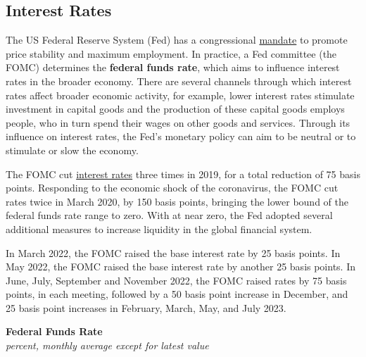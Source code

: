 \documentclass{report}
\begin{document}
{\begin{minipage}{1.0\textwidth}
\subsection*{Interest Rates}
\hypertarget{capint}{\label{capint}}
\small The US Federal Reserve System (Fed) has a congressional \href{https://www.federalreserve.gov/faqs/money_12848.htm}{mandate} to promote price stability and maximum employment. In practice, a Fed committee (the FOMC) determines the \textbf{federal funds rate}, which aims to influence interest rates in the broader economy. There are several channels through which interest rates affect broader economic activity, for example, lower interest rates stimulate investment in capital goods and the production of these capital goods employs people, who in turn spend their wages on other goods and services. Through its influence on interest rates, the Fed's monetary policy can aim to be neutral or to stimulate or slow the economy.

The FOMC cut \href{https://www.federalreserve.gov/releases/h15/}{interest rates} three times in 2019, for a total reduction of 75 basis points. Responding to the economic shock of the coronavirus, the FOMC cut rates twice in March 2020, by 150 basis points, bringing the lower bound of the federal funds rate range to zero. With at near zero, the Fed adopted several additional measures to increase liquidity in the global financial system.

In March 2022, the FOMC raised the base interest rate by 25 basis points. In May 2022, the FOMC raised the base interest rate by another 25 basis points. In June, July, September and November 2022, the FOMC raised rates by 75 basis points, in each meeting, followed by a 50 basis point increase in December, and 25 basis point increases in February, March, May, and July 2023. 
\vspace{2mm}

\normalsize \textbf{Federal Funds Rate}\\
\footnotesize{\textit{percent, monthly average except for latest value}}
\vspace{5.5cm}


\end{minipage}}
\end{document}
